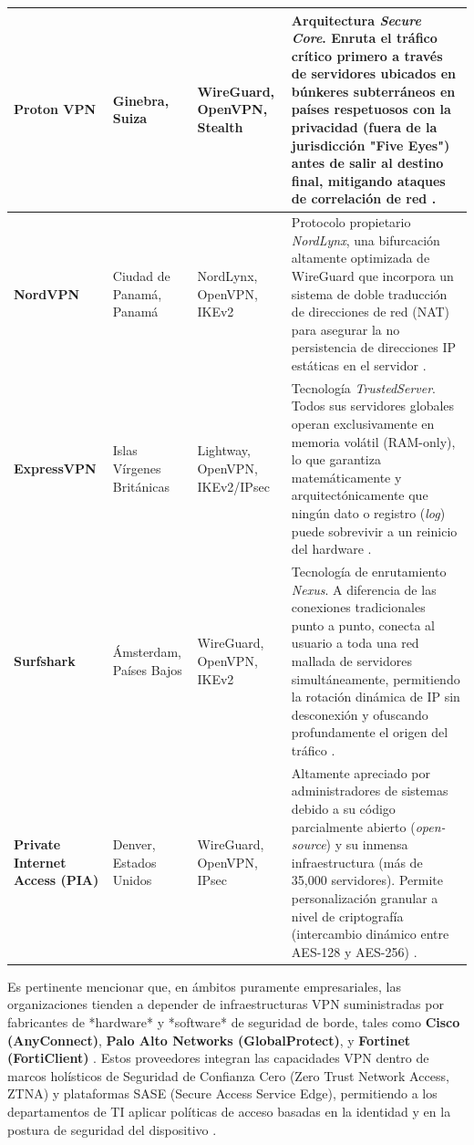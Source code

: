 \documentclass[a4paper,12pt]{article}
\begin{document}
{\begin{longtable}{|p{3cm}|p{3.5cm}|p{3cm}|p{5cm}|}
        \textbf{Proton VPN} & Ginebra, Suiza & WireGuard, OpenVPN, Stealth & Arquitectura \textit{Secure Core}. Enruta el tráfico crítico primero a través de servidores ubicados en búnkeres subterráneos en países respetuosos con la privacidad (fuera de la jurisdicción "Five Eyes") antes de salir al destino final, mitigando ataques de correlación de red \cite{gizmodo_vpn}. \\
        \hline
        \textbf{NordVPN} & Ciudad de Panamá, Panamá & NordLynx, OpenVPN, IKEv2 & Protocolo propietario \textit{NordLynx}, una bifurcación altamente optimizada de WireGuard que incorpora un sistema de doble traducción de direcciones de red (NAT) para asegurar la no persistencia de direcciones IP estáticas en el servidor \cite{nordvpn_uses, xataka_vpn_2026}. \\
        \hline
        \textbf{ExpressVPN} & Islas Vírgenes Británicas & Lightway, OpenVPN, IKEv2/IPsec & Tecnología \textit{TrustedServer}. Todos sus servidores globales operan exclusivamente en memoria volátil (RAM-only), lo que garantiza matemáticamente y arquitectónicamente que ningún dato o registro (\textit{log}) puede sobrevivir a un reinicio del hardware \cite{gizmodo_vpn}. \\
        \hline
        \textbf{Surfshark} & Ámsterdam, Países Bajos & WireGuard, OpenVPN, IKEv2 & Tecnología de enrutamiento \textit{Nexus}. A diferencia de las conexiones tradicionales punto a punto, conecta al usuario a toda una red mallada de servidores simultáneamente, permitiendo la rotación dinámica de IP sin desconexión y ofuscando profundamente el origen del tráfico \cite{gizmodo_vpn}. \\
        \hline
        \textbf{Private Internet Access (PIA)} & Denver, Estados Unidos & WireGuard, OpenVPN, IPsec & Altamente apreciado por administradores de sistemas debido a su código parcialmente abierto (\textit{open-source}) y su inmensa infraestructura (más de 35,000 servidores). Permite personalización granular a nivel de criptografía (intercambio dinámico entre AES-128 y AES-256) \cite{gizmodo_vpn}. \\
    \end{longtable}
}

Es pertinente mencionar que, en ámbitos puramente empresariales, las organizaciones tienden a depender de infraestructuras VPN suministradas por fabricantes de *hardware* y *software* de seguridad de borde, tales como \textbf{Cisco (AnyConnect)}, \textbf{Palo Alto Networks (GlobalProtect)}, y \textbf{Fortinet (FortiClient)} \cite{cisco_vpn_types, checkpoint_vpn_enterprise}. Estos proveedores integran las capacidades VPN dentro de marcos holísticos de Seguridad de Confianza Cero (Zero Trust Network Access, ZTNA) y plataformas SASE (Secure Access Service Edge), permitiendo a los departamentos de TI aplicar políticas de acceso basadas en la identidad y en la postura de seguridad del dispositivo \cite{zscaler_vpn}.
\end{document}
